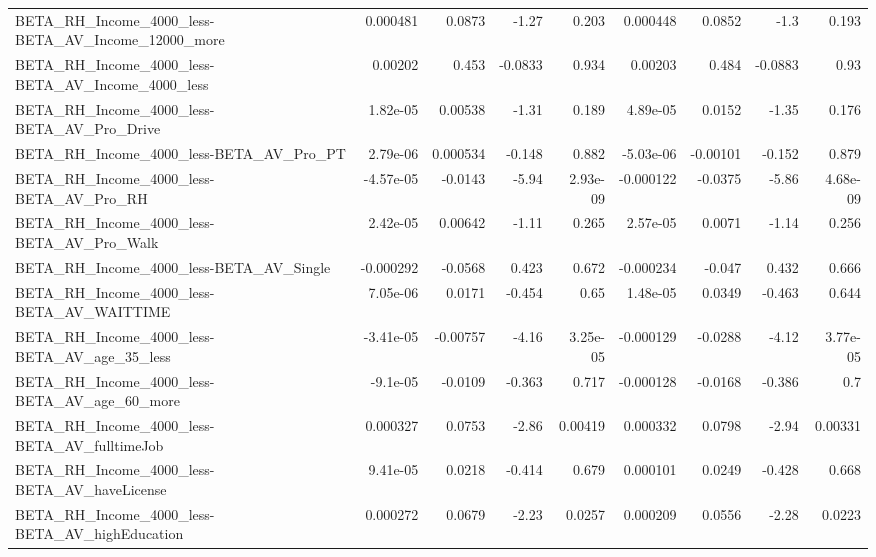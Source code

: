 \begin{tabular}{lrrrrrrrr}
BETA\_RH\_Income\_4000\_less-BETA\_AV\_Income\_12000\_more &    0.000481 &       0.0873 &     -1.27 &    0.203 &   0.000448 &      0.0852 &         -1.3 &         0.193 \\
BETA\_RH\_Income\_4000\_less-BETA\_AV\_Income\_4000\_less  &     0.00202 &        0.453 &   -0.0833 &    0.934 &    0.00203 &       0.484 &      -0.0883 &          0.93 \\
BETA\_RH\_Income\_4000\_less-BETA\_AV\_Pro\_Drive         &    1.82e-05 &      0.00538 &     -1.31 &    0.189 &   4.89e-05 &      0.0152 &        -1.35 &         0.176 \\
BETA\_RH\_Income\_4000\_less-BETA\_AV\_Pro\_PT            &    2.79e-06 &     0.000534 &    -0.148 &    0.882 &  -5.03e-06 &    -0.00101 &       -0.152 &         0.879 \\
BETA\_RH\_Income\_4000\_less-BETA\_AV\_Pro\_RH            &   -4.57e-05 &      -0.0143 &     -5.94 & 2.93e-09 &  -0.000122 &     -0.0375 &        -5.86 &      4.68e-09 \\
BETA\_RH\_Income\_4000\_less-BETA\_AV\_Pro\_Walk          &    2.42e-05 &      0.00642 &     -1.11 &    0.265 &   2.57e-05 &      0.0071 &        -1.14 &         0.256 \\
BETA\_RH\_Income\_4000\_less-BETA\_AV\_Single            &   -0.000292 &      -0.0568 &     0.423 &    0.672 &  -0.000234 &      -0.047 &        0.432 &         0.666 \\
BETA\_RH\_Income\_4000\_less-BETA\_AV\_WAITTIME          &    7.05e-06 &       0.0171 &    -0.454 &     0.65 &   1.48e-05 &      0.0349 &       -0.463 &         0.644 \\
BETA\_RH\_Income\_4000\_less-BETA\_AV\_age\_35\_less       &   -3.41e-05 &     -0.00757 &     -4.16 & 3.25e-05 &  -0.000129 &     -0.0288 &        -4.12 &      3.77e-05 \\
BETA\_RH\_Income\_4000\_less-BETA\_AV\_age\_60\_more       &    -9.1e-05 &      -0.0109 &    -0.363 &    0.717 &  -0.000128 &     -0.0168 &       -0.386 &           0.7 \\
BETA\_RH\_Income\_4000\_less-BETA\_AV\_fulltimeJob       &    0.000327 &       0.0753 &     -2.86 &  0.00419 &   0.000332 &      0.0798 &        -2.94 &       0.00331 \\
BETA\_RH\_Income\_4000\_less-BETA\_AV\_haveLicense       &    9.41e-05 &       0.0218 &    -0.414 &    0.679 &   0.000101 &      0.0249 &       -0.428 &         0.668 \\
BETA\_RH\_Income\_4000\_less-BETA\_AV\_highEducation     &    0.000272 &       0.0679 &     -2.23 &   0.0257 &   0.000209 &      0.0556 &        -2.28 &        0.0223 \\

\end{tabular}
